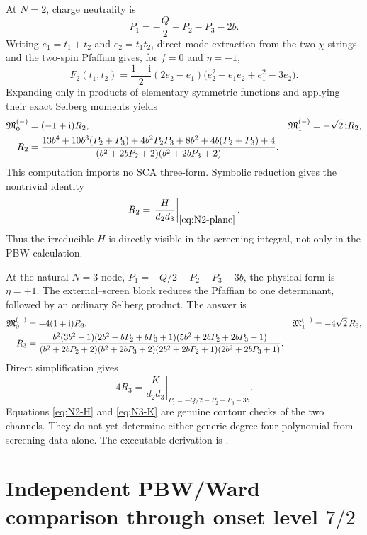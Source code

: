 \documentclass[11pt]{article}
\newcommand{\ii}{\mathrm i}
\begin{document}
At $N=2$, charge neutrality is
\begin{equation}
 P_1=-\frac Q2-P_2-P_3-2b.
 \label{eq:N2-plane}
\end{equation}
Writing $e_1=t_1+t_2$ and $e_2=t_1t_2$, direct mode extraction from the two
$\chi$ strings and the two-spin Pfaffian gives, for $f=0$ and $\eta=-1$,
\begin{equation}
 F_2(t_1,t_2)=\frac{1-\ii}{2}(2e_2-e_1)
 \bigl(e_2^2-e_1e_2+e_1^2-3e_2\bigr).
 \label{eq:N2-integrand}
\end{equation}
Expanding only in products of elementary symmetric functions and applying
their exact Selberg moments yields
\begin{align}
 \mathfrak M_0^{(-)}&=(-1+\ii)R_2,&
 \mathfrak M_1^{(-)}&=-\sqrt2\,\ii R_2,\notag\\
 R_2&=
 \frac{13b^4+10b^3(P_2+P_3)+4b^2P_2P_3+8b^2
       +4b(P_2+P_3)+4}
 {(b^2+2bP_2+2)(b^2+2bP_3+2)}.
 \label{eq:N2-result}
\end{align}
This computation imports no SCA three-form.  Symbolic reduction gives the
nontrivial identity
\begin{equation}
 R_2=\left.\frac{H}{d_2d_3}\right|_{\eqref{eq:N2-plane}}.
 \label{eq:N2-H}
\end{equation}
Thus the irreducible $H$ is directly visible in the screening integral, not
only in the PBW calculation.

At the natural $N=3$ node,
$P_1=-Q/2-P_2-P_3-3b$, the physical form is $\eta=+1$.  The external--screen
block reduces the Pfaffian to one determinant, followed by an ordinary
Selberg product.  The answer is
\begin{align}
 \mathfrak M_0^{(+)}&=-4(1+\ii)R_3,&
 \mathfrak M_1^{(+)}&=-4\sqrt2\,R_3,\notag\\
 R_3&=
 \frac{b^2(3b^2-1)
 (2b^2+bP_2+bP_3+1)(5b^2+2bP_2+2bP_3+1)}
 {(b^2+2bP_2+2)(b^2+2bP_3+2)
  (2b^2+2bP_2+1)(2b^2+2bP_3+1)}.
 \label{eq:N3-result}
\end{align}
Direct simplification gives
\begin{equation}
 4R_3=\left.\frac{K}{d_2d_3}
 \right|_{P_1=-Q/2-P_2-P_3-3b}.
 \label{eq:N3-K}
\end{equation}
Equations \eqref{eq:N2-H} and \eqref{eq:N3-K} are genuine contour checks
of the two channels.  They do not yet determine either generic degree-four
polynomial from screening data alone.  The executable derivation is
.

\section{Independent PBW/Ward comparison through onset level
\texorpdfstring{$7/2$}{7/2}}
\end{document}
